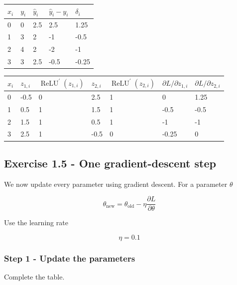 \documentclass[10pt]{article}
\begin{document}
\begin{center}
\begingroup
\small
\setlength{\tabcolsep}{4pt}
\begin{tabular}{l|l|l|l|l}
$x_i$ & $y_i$ & $\hat y_i$ & $\hat y_i-y_i$ & $\delta_i$ \\ \hline
0 & 0 & 2.5 & 2.5 & 1.25 \\[1.5pt]
1 & 3 & 2 & -1 & -0.5 \\[1.5pt]
2 & 4 & 2 & -2 & -1 \\[1.5pt]
3 & 3 & 2.5 & -0.5 & -0.25 \\[1.5pt]
\end{tabular}
\endgroup
\end{center}

\begin{center}
\begingroup
\small
\setlength{\tabcolsep}{4pt}
\begin{tabular}{l|l|l|l|l|l|l}
$x_i$ & $z_{1,i}$ & $\operatorname{ReLU}^\prime(z_{1,i})$ & $z_{2,i}$ & $\operatorname{ReLU}^\prime(z_{2,i})$ & $\partial L/\partial z_{1,i}$ & $\partial L/\partial z_{2,i}$ \\ \hline
0 & -0.5 & 0 & 2.5 & 1 & 0 & 1.25 \\[1.5pt]
1 & 0.5 & 1 & 1.5 & 1 & -0.5 & -0.5 \\[1.5pt]
2 & 1.5 & 1 & 0.5 & 1 & -1 & -1 \\[1.5pt]
3 & 2.5 & 1 & -0.5 & 0 & -0.25 & 0 \\[1.5pt]
\end{tabular}
\endgroup
\end{center}
\par\endgroup

\subsection*{Exercise 1.5 - One gradient-descent step}
We now update every parameter using gradient descent. For a parameter $\theta$

\[
\theta_{\mathrm{new}}=\theta_{\mathrm{old}}-\eta\frac{\partial L}{\partial\theta}
\]

Use the learning rate

\[
\eta=0.1
\]

\subsubsection*{Step 1 - Update the parameters}
Complete the table.
\end{document}
